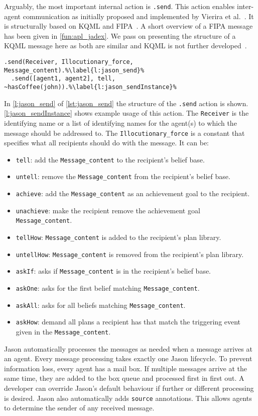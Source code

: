 Arguably, the most important internal action is \texttt{.send}.
This action enables inter-agent communication as initially proposed and implemented by Vierira et al.~\cite{vieira_formal_2007}.
It is structurally based on KQML and FIPA~\cite{fernandez_evaluating_2010}.
A short overview of a FIPA message has been given in \autoref{fun:apl_jadex}.
We pass on presenting the structure of a KQML message here as both are similar and KQML is not further developed~\cite{obrien_fipatowards_1998}.
\begin{lstlisting}[caption={Parameters of the internal action \texttt{.send} and an example.}, label=lst:jason_send]
  .send(Receiver, Illocutionary_force, Message_content).%\label{l:jason_send}%
  .send([agent1, agent2], tell, ~hasCoffee(john)).%\label{l:jason_sendInstance}%
\end{lstlisting}
In \autoref{l:jason_send} of \autoref{lst:jason_send} the structure of the \texttt{.send} action is shown.
\autoref{l:jason_sendInstance} shows example usage of this action.
The \texttt{Receiver} is the identifying name or a list of identifying names for the agent(s) to which the message should be addressed to.
The \texttt{Illocutionary\_force} is a constant that specifies what all recipients should do with the message.
It can be:
\begin{itemize}
  \item \texttt{tell}: add the \texttt{Message\_content} to the recipient's belief base.
  \item \texttt{untell}: remove the \texttt{Message\_content} from the recipient's belief base.
  \item \texttt{achieve}: add the \texttt{Message\_content} as an achievement goal to the recipient.
  \item \texttt{unachieve}: make the recipient remove the achievement goal \texttt{Message\_content}.
  \item \texttt{tellHow}: \texttt{Message\_content} is added to the recipient's plan library.
  \item \texttt{untellHow}: \texttt{Message\_content} is removed from the recipient's plan library.
  \item \texttt{askIf}: asks if \texttt{Message\_content} is in the recipient's belief base.
  \item \texttt{askOne}: asks for the first belief matching \texttt{Message\_content}.
  \item \texttt{askAll}: asks for all beliefs matching \texttt{Message\_content}.
  \item \texttt{askHow}: demand all plans a recipient has that match the triggering event given in the \texttt{Message\_content}.
\end{itemize}
Jason automatically processes the messages as needed when a message arrives at an agent.
Every message processing takes exactly one Jason lifecycle.
To prevent information loss, every agent has a mail box.
If multiple messages arrive at the same time, they are added to the box queue and processed first in first out.
A developer can override Jason's default behaviour if further or different processing is desired.
Jason also automatically adds \texttt{source} annotations.
This allows agents to determine the sender of any received message.

